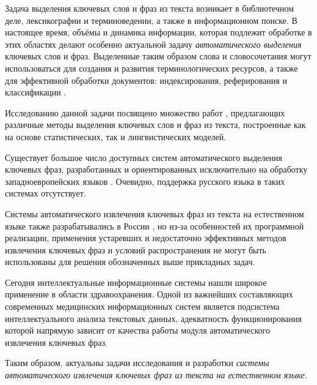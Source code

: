 \Introduction
Задача выделения ключевых слов и фраз из текста возникает в
библиотечном деле, лексикографии и терминоведении, а также в
информационном поиске. В настоящее время, объёмы и динамика
информации, которая подлежит обработке в этих областях делают
особенно актуальной задачу \emph{автоматического выделения}
ключевых слов и фраз. Выделенные таким образом слова и
словосочетания могут использоваться для создания и развития
терминологических ресурсов, а также для эффективной обработки
документов: индексирования, реферирования и классификации
\cite{Braslavsky06}.

Исследованию данной задачи посвящено множество работ
\cite{Medelyan09,Turney00,Frantzi00,Witten99}, предлагающих
различные методы выделения ключевых слов и фраз из текста,
построенные как на основе статистических, так и лингвистических
моделей.

Существует большое число доступных систем автоматического выделения
ключевых фраз, разработанных и ориентированных исключительно на
обработку западноевропейских языков
\cite{OpenCalais,Extractor,YahooTermExtractionWebService,TerMine,Maui}. Очевидно,
поддержка русского языка в таких системах отсутствует.

Системы автоматического извлечения ключевых фраз из текста на
естественном языке также разрабатывались в России
\cite{TextAnalyst,AOTSynAn,ContentAnalyzer,SemanticMirror},
но из-за особенностей их программной реализации,
применения устаревших и недостаточно эффективных методов извлечения
ключевых фраз \cite{Braslavsky06,Braslavsky07,Braslavsky08}
и условий распространения не могут быть использованы для решения
обозначенных выше прикладных задач.

Сегодня интеллектуальные информационные системы нашли широкое
применение в области здравоохранения. Одной из важнейших
составляющих современных медицинских информационных систем является
подсистема интеллектуального анализа текстовых данных, адекватность
функционирования которой напрямую зависит от качества работы модуля
автоматического извлечения ключевых фраз.

Таким образом, актуальны задачи исследования и разработки \emph{системы
автоматического извлечения ключевых фраз из текста на естественном
языке}.

